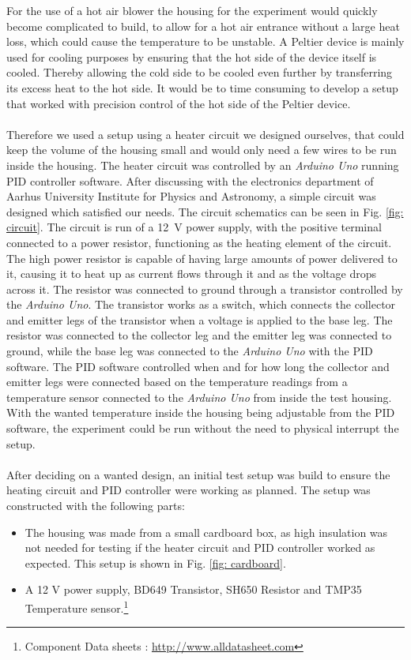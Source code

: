 For the use of a hot air blower  the housing for the experiment would quickly become complicated to build, to allow for a hot air entrance without a large heat loss, which could cause the temperature to be unstable. A Peltier device is mainly used for cooling purposes by ensuring that the hot side of the device itself is cooled. Thereby allowing the cold side to be cooled even further by transferring its excess heat to the hot side. It would be to time consuming  to develop a setup that worked with precision control of the hot side of the Peltier device. 
\\
\\
Therefore we used a setup using a heater circuit we designed ourselves, that could keep the volume of the housing small and would only need a few wires to be run inside the housing. The heater circuit was controlled by an \emph{Arduino Uno} running PID controller software.
After discussing with the electronics department of Aarhus University Institute for Physics and Astronomy, a simple circuit was designed which satisfied our needs. The circuit schematics can be seen in Fig. \ref{fig: circuit}. The circuit is run of a \SI{12}{\volt} power supply, with the positive terminal connected to a power resistor, functioning as the heating element of the circuit. The high power resistor is capable of having large amounts of power delivered to it, causing it to heat up as current flows through it and as the voltage drops across it. The resistor was connected to ground through a transistor controlled by the \emph{Arduino Uno}. The transistor works as a switch, which connects the collector and emitter legs of the transistor when a voltage is applied to the base leg. The resistor was connected to the collector leg and the emitter leg was connected to ground, while the base leg was connected to the \emph{Arduino Uno} with the PID software. The PID software  controlled when and for how long the collector and emitter legs were connected based on the temperature readings from a temperature sensor connected to the \emph{Arduino Uno} from inside the test housing. With the wanted temperature inside the housing being adjustable from the PID software, the experiment could be run without the need to physical interrupt the setup. 
\\
\\
After deciding on a wanted design, an initial test setup was build to ensure the heating circuit and PID controller were working as planned. The setup was constructed with the following parts:
\begin{itemize}
\item The housing was made from a small cardboard box, as high insulation was not needed for testing if the heater circuit and PID controller worked as expected. This setup is shown in Fig. \ref{fig: cardboard}.
\item A 12 V power supply, BD649 Transistor, SH650 Resistor and TMP35 Temperature sensor.\footnote{Component Data sheets : \url{http://www.alldatasheet.com}}
\end{itemize}

